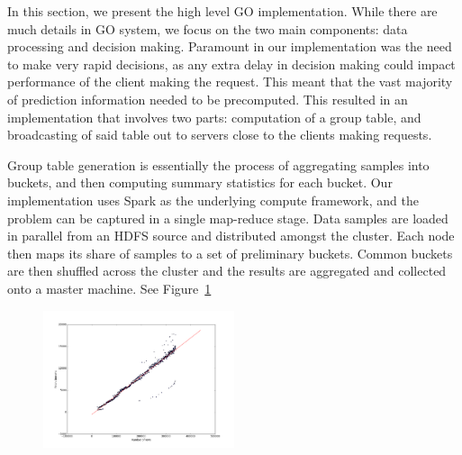 \label{sec:impl}

In this section, we present the high level GO implementation. While there are much details in GO system, we focus on the two main components: data processing and decision making. Paramount in our implementation was the need to make very rapid decisions, as any extra delay in decision making could impact performance of the client making the request. This meant that the vast majority of prediction information needed to be precomputed. This resulted in an implementation that involves two parts: computation of a group table, and broadcasting of said table out to servers close to the clients making requests.



 Group table generation is essentially the process of aggregating samples into buckets, and then computing summary statistics for each bucket.  Our implementation uses Spark as the underlying compute framework, and the problem can be captured in a single map-reduce stage. Data samples are loaded in parallel from an HDFS source and distributed amongst the cluster. Each node then maps its share of samples to a set of preliminary buckets. Common buckets are then shuffled across the cluster and the results are aggregated and collected onto a master machine. See Figure~\ref{fig:computing-scale}

\begin{figure}[h!]
\centering
 \includegraphics[width=0.5\textwidth] {figures/scale/fetch_time_scale.pdf}
\label{fig:computing-scale}
\end{figure}


